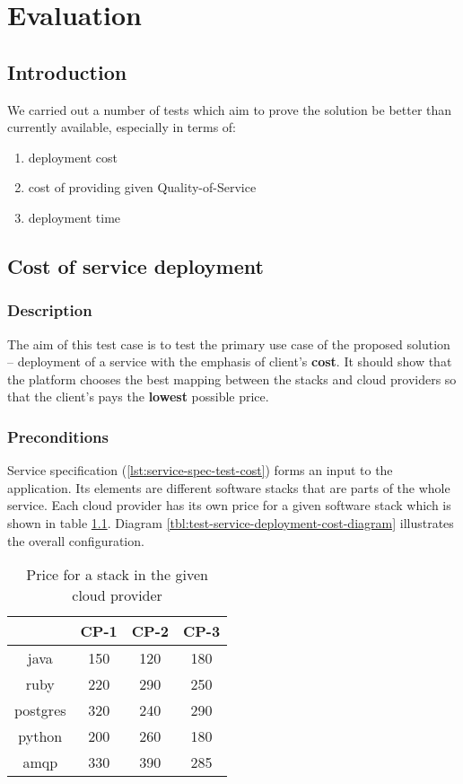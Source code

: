 \chapter{Evaluation}


\section{Introduction}
We carried out a number of tests which aim to prove the solution be better than currently available, especially in terms of:
\begin{enumerate}
  \item deployment cost
  \item cost of providing given Quality-of-Service
  \item deployment time
\end{enumerate}

\section{Cost of service deployment}
\subsection*{Description}
The aim of this test case is to test the primary use case of the proposed solution -- deployment of a service with the emphasis of client's \textbf{cost}. It should show that the platform chooses the best mapping between the stacks and cloud providers so that the client's pays the \textbf{lowest} possible price.

\subsection*{Preconditions}
Service specification (\ref{lst:service-spec-test-cost}) forms an input to the application. Its elements are different software stacks that are parts of the whole service. Each cloud provider has its own price for a given software stack which is shown in table \ref{tbl:test-service-deployment-cost}. Diagram \ref{tbl:test-service-deployment-cost-diagram} illustrates the overall configuration.

\begin{table}
  \centering
  \begin{tabular}{ | c | c | c | c | }
    \hline                        
    & CP-1 & CP-2 & CP-3 \\
    \hline
    java      & 150 & 120 & 180 \\
    ruby      & 220 & 290 & 250 \\
    postgres  & 320 & 240 & 290 \\
    python    & 200 & 260 & 180 \\
    amqp      & 330 & 390 & 285 \\
    \hline  
  \end{tabular}
  \caption{Price for a stack in the given cloud provider}
  \label{tbl:test-service-deployment-cost}
\end{table}

